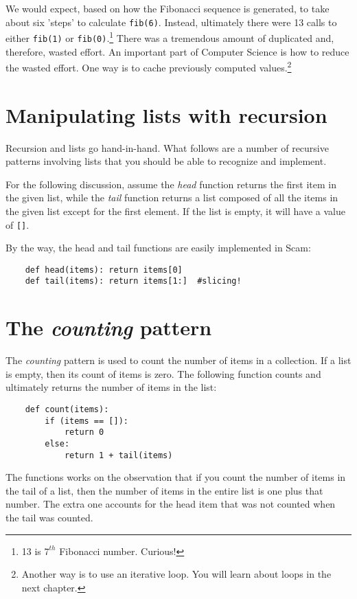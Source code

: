 We would expect, based on how the Fibonacci sequence is
generated,
to take about six 'steps' to calculate \verb!fib(6)!. 
Instead,
ultimately there were 13 calls to either
\verb!fib(1)! or \verb!fib(0)!.\footnote{
13 is $7^{th}$ Fibonacci number. Curious!
}
There was a tremendous amount of duplicated
and, therefore, wasted effort. An important part
of Computer Science is how to reduce the wasted effort.
One way is to cache previously computed values.\footnote{
Another way is to use an iterative loop. You will learn
about loops in the next chapter.}

\section{Manipulating lists with recursion}

Recursion and lists go hand-in-hand. What follows
are a number of recursive patterns involving lists
that you should be able to recognize and implement.

For the following discussion, assume the 
{\it head} function returns the first item in the given list,
while the
{\it tail}
function returns a list composed of all the items
in the given list except for the first element.
If the list is empty, it will have a value of 
\verb![]!.

By the way, the head and tail functions are easily implemented
in Scam:

\begin{verbatim}
    def head(items): return items[0]
    def tail(items): return items[1:]  #slicing!
\end{verbatim}

\section{The {\it counting} pattern}

The {\it counting} pattern is used to count the number of items
in a collection. If a list is empty, then its count of items
is zero.
The following function
counts and ultimately returns the number of items in the list:

\begin{verbatim}
    def count(items):
        if (items == []):
            return 0
        else:
            return 1 + tail(items)
\end{verbatim}

The functions works on the observation that if you count
the number of items in the tail of a list, then the number
of items in the entire list is one plus that number. The
extra one accounts for the head item that was not counted when the
tail was counted.

